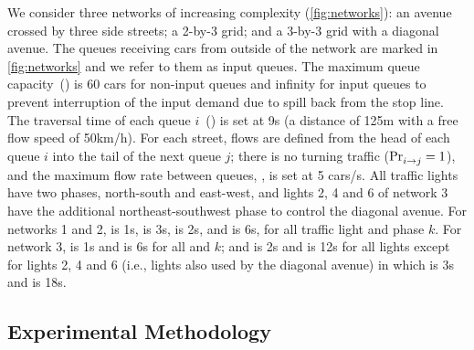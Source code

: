 We consider three networks of increasing complexity (\cref{fig:networks}): an
avenue crossed by three side streets; a 2-by-3 grid; and a 3-by-3 grid with a
diagonal avenue.
%
The queues receiving cars from outside of the network are marked in
\cref{fig:networks} and we refer to them as input queues.
%
The maximum queue capacity~() is 60 cars for non-input queues and
infinity for input queues to prevent interruption of the input demand due to
spill back from the stop line. 
%
The traversal time of each queue $i$~() is set at 9s (a distance of
125m with a free flow speed of 50km/h).
%
For each street, flows are defined from the head of each queue $i$ into the tail of the next
queue $j$;
%
there is no turning traffic ($\mathrm{Pr}_{i\to j}^{\mathrm{}}=1$), and the maximum flow rate
between queues, , is set at 5 cars/s.
%
All traffic lights have two phases, north-south and east-west, and lights 2, 4
and 6 of network 3 have the additional northeast-southwest phase to control the
diagonal avenue.
%
For networks 1 and 2,  is 1s,  is 3s, \CTMIN{\tl} is
2s, and \CTMAX{\tl} is 6s, for all traffic light \tl and phase $k$.
%
For network 3,  is 1s and  is 6s for all \tl and
$k$; and \CTMIN{\tl} is 2s and \CTMAX{\tl} is 12s for all lights \tl except for
lights 2, 4 and 6 (i.e., lights also used by the diagonal avenue) in which
\CTMIN{\tl} is 3s and \CTMAX{\tl} is 18s.




\subsection{Experimental Methodology}




